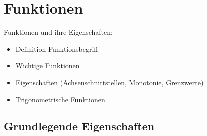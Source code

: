 \chapter{Funktionen}

\begin{inhalt}
  Funktionen und ihre Eigenschaften:
  \begin{itemize}
    \item Definition Funktionsbegriff
    \item Wichtige Funktionen
    \item Eigenschaften (Achsenschnittstellen, Monotonie, Grenzwerte)
    \item Trigonometrische Funktionen
  \end{itemize}
\end{inhalt}

\section{Grundlegende Eigenschaften}

